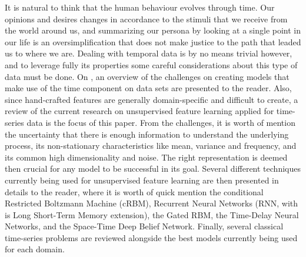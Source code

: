\documentclass{kththesis}
\begin{document}
It is natural to think that the human behaviour evolves through time. Our opinions and desires changes in accordance to the stimuli that we receive from the world around us, and summarizing our persona by looking at a single point in our life is an oversimplification that does not make justice to the path that leaded us to where we are. Dealing with temporal data is by no means trivial however, and to leverage fully its properties some careful considerations about this type of data must be done. On \citep{Langkvist2014}, an overview of the challenges on creating models that make use of the time component on data sets are presented to the reader. Also, since hand-crafted features are generally domain-specific and difficult to create, a review of the current research on unsupervised feature learning applied for time-series data is the focus of this paper. From the challenges, it is worth of mention the uncertainty that there is enough information to understand the underlying process, its non-stationary characteristics like mean, variance and frequency, and its common high dimensionality and noise. The right representation is deemed then crucial for any model to be successful in its goal. Several different techniques currently being used for unsupervised feature learning are then presented in details to the reader, where it is worth of quick mention the conditional Restricted Boltzmann Machine (cRBM), Recurrent Neural Networks (RNN, with is Long Short-Term Memory extension), the Gated RBM, the Time-Delay Neural Networks, and the Space-Time Deep Belief Network. Finally, several classical time-series problems are reviewed alongside the best models currently being used for each domain. 
\end{document}
